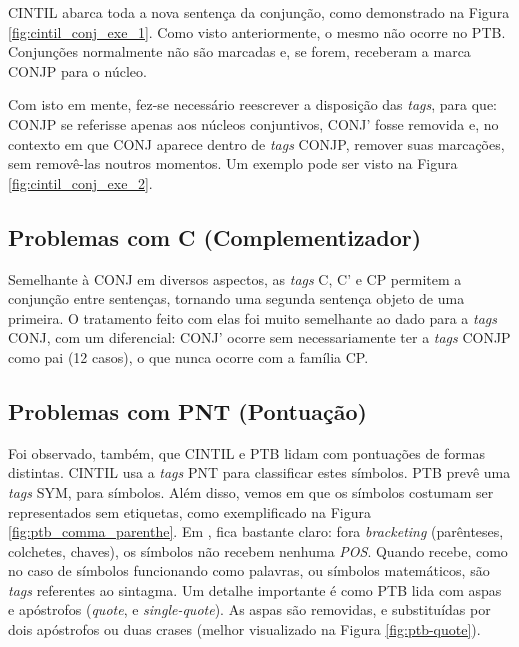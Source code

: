 CINTIL abarca toda a nova sentença da conjunção, como demonstrado na Figura \ref{fig:cintil_conj_exe_1}. Como visto anteriormente, o mesmo não ocorre no PTB. Conjunções normalmente não são marcadas e, se forem, receberam a marca CONJP para o núcleo.
\begin{center}

\end{center}

Com isto em mente, fez-se necessário reescrever a disposição das \textit{tags}, para que: CONJP se referisse apenas aos núcleos conjuntivos, CONJ’ fosse removida e, no contexto em que CONJ aparece dentro de \textit{tags} CONJP, remover suas marcações, sem removê-las noutros momentos. Um exemplo pode ser visto na Figura \ref{fig:cintil_conj_exe_2}.
\begin{center}

\end{center}

\subsection{Problemas com C (Complementizador)}
\label{subsec-cintil-c}

Semelhante à CONJ em diversos aspectos, as \textit{tags} C, C’ e CP permitem a conjunção entre sentenças, tornando uma segunda sentença objeto de uma primeira. O tratamento feito com elas foi muito semelhante ao dado para a \textit{tags} CONJ, com um diferencial: CONJ’ ocorre sem necessariamente ter a \textit{tags} CONJP como pai (12 casos), o que nunca ocorre com a família CP. 

\subsection{Problemas com PNT (Pontuação)}
\label{subsec:cintil-pnt}

Foi observado, também, que CINTIL e PTB lidam com pontuações de formas distintas. CINTIL usa a \textit{tags} PNT para classificar estes símbolos. PTB prevê uma \textit{tags} SYM, para símbolos. Além disso, vemos em \cite[p~52]{buildingPTB} que os símbolos costumam ser representados sem etiquetas, como exemplificado na Figura \ref{fig:ptb_comma_parenthe}. Em \cite[p~52]{bracketing_ptb}, fica bastante claro: fora \textit{bracketing} (parênteses, colchetes, chaves), os símbolos não recebem nenhuma \textit{POS}. Quando recebe, como no caso de símbolos funcionando como palavras, ou símbolos matemáticos, são \textit{tags} referentes ao sintagma. Um detalhe importante é como PTB lida com aspas e apóstrofos (\textit{quote}, e \textit{single-quote}). As aspas são removidas, e substituídas por dois apóstrofos ou duas crases (melhor visualizado na Figura \ref{fig:ptb-quote}).

